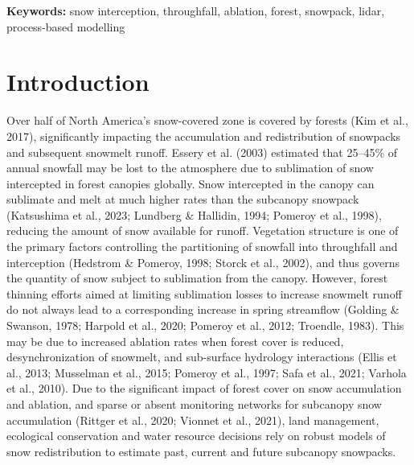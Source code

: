 \documentclass[
  letterpaper,
  DIV=11,
  numbers=noendperiod]{scrartcl}
\begin{document}
\textbf{Keywords:} snow interception, throughfall, ablation, forest,
snowpack, lidar, process-based modelling

\section{Introduction}\label{introduction}

Over half of North America's snow-covered zone is covered by forests
(Kim et al., 2017), significantly impacting the accumulation and
redistribution of snowpacks and subsequent snowmelt runoff. Essery et
al. (2003) estimated that 25--45\% of annual snowfall may be lost to the
atmosphere due to sublimation of snow intercepted in forest canopies
globally. Snow intercepted in the canopy can sublimate and melt at much
higher rates than the subcanopy snowpack (Katsushima et al., 2023;
Lundberg \& Hallidin, 1994; Pomeroy et al., 1998), reducing the amount
of snow available for runoff. Vegetation structure is one of the primary
factors controlling the partitioning of snowfall into throughfall and
interception (Hedstrom \& Pomeroy, 1998; Storck et al., 2002), and thus
governs the quantity of snow subject to sublimation from the canopy.
However, forest thinning efforts aimed at limiting sublimation losses to
increase snowmelt runoff do not always lead to a corresponding increase
in spring streamflow (Golding \& Swanson, 1978; Harpold et al., 2020;
Pomeroy et al., 2012; Troendle, 1983). This may be due to increased
ablation rates when forest cover is reduced, desynchronization of
snowmelt, and sub-surface hydrology interactions (Ellis et al., 2013;
Musselman et al., 2015; Pomeroy et al., 1997; Safa et al., 2021; Varhola
et al., 2010). Due to the significant impact of forest cover on snow
accumulation and ablation, and sparse or absent monitoring networks for
subcanopy snow accumulation (Rittger et al., 2020; Vionnet et al.,
2021), land management, ecological conservation and water resource
decisions rely on robust models of snow redistribution to estimate past,
current and future subcanopy snowpacks.
\end{document}
